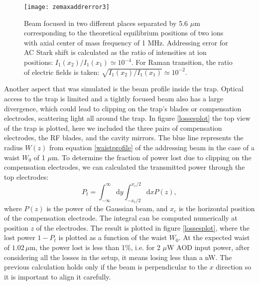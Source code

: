  \begin{figure}
 \centering
 \texttt{[image: zemaxaddrerror3]}
 \caption{Beam focused in two different places separated by 5.6 $\mu$m corresponding to the theoretical equilibrium positions of two ions with axial center of mass frequency of 1 MHz. Addressing error for AC Stark shift is calculated as the ratio of intensities at ion positions: $I_1(x_2)/I_1(x_1) \simeq 10^{-4}$. For Raman transition, the ratio of electric fields is taken: $\sqrt{I_1(x_2)/I_1(x_1)} \simeq 10^{-2}$.}
 \label{zemaxaddrerror.png}
 \end{figure}
Another aspect that was simulated is the beam profile inside the trap. Optical access to the trap is limited and a tightly focused beam also has a large divergence, which could lead to clipping on the trap's blades or compensation electrodes, scattering light all around the trap. In figure \ref{lossesplot} the top view of the trap is plotted, here we included the three pairs of compensation electrodes, the RF blades, and the cavity mirrors. The blue line represents the radius $W(z)$ from equation \ref{waistprofile} of the addressing beam in the case of a waist $W_0$ of 1 $\mu$m. To determine the fraction of power lost due to clipping on the compensation electrodes, we can calculated the transmitted power through the top electrodes:
\begin{equation}
P_{t} = \int_{-\infty}^{\infty}\text{d}y \int_{-x_c/2}^{x_c/2}\text{d}x P(z),
\end{equation}
where $P(z)$ is the power of the Gaussian beam, and $x_c$ is the horizontal position of the compensation electrode. The integral can be computed numerically at position $z$ of the electrodes. The result is plotted in figure \ref{lossesplot}, where the lost power $1-P_{t}$ is plotted as a function of the waist $W_0$. At the expected waist of $1.02\,\mu$m, the power lost is less than 1\%, i.e. for 2 $\mu$W AOD input power, after considering all the losses in the setup, it means losing less than a nW. The previous calculation holds only if the beam is perpendicular to the $x$ direction so it is important to align it carefully.
